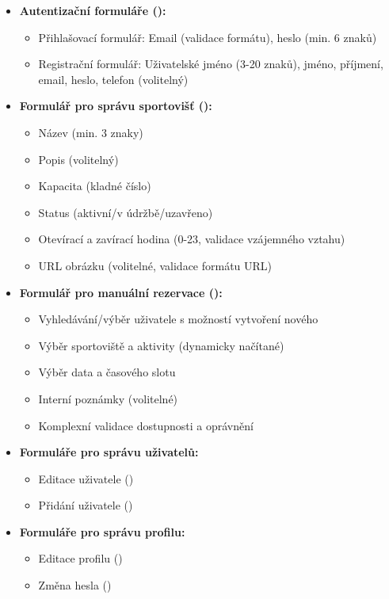 \documentclass[12pt, a4paper]{article}
\begin{document}
\begin{itemize}
    \item \textbf{Autentizační formuláře ():}
        \begin{itemize}
            \item Přihlašovací formulář: Email (validace formátu), heslo (min. 6 znaků)
            \item Registrační formulář: Uživatelské jméno (3-20 znaků), jméno, příjmení, email, heslo, telefon (volitelný)
        \end{itemize}
    \item \textbf{Formulář pro správu sportovišť ():}
        \begin{itemize}
            \item Název (min. 3 znaky)
            \item Popis (volitelný)
            \item Kapacita (kladné číslo)
            \item Status (aktivní/v údržbě/uzavřeno)
            \item Otevírací a zavírací hodina (0-23, validace vzájemného vztahu)
            \item URL obrázku (volitelné, validace formátu URL)
        \end{itemize}
    \item \textbf{Formulář pro manuální rezervace ():}
        \begin{itemize}
            \item Vyhledávání/výběr uživatele s možností vytvoření nového
            \item Výběr sportoviště a aktivity (dynamicky načítané)
            \item Výběr data a časového slotu
            \item Interní poznámky (volitelné)
            \item Komplexní validace dostupnosti a oprávnění
        \end{itemize}
    \item \textbf{Formuláře pro správu uživatelů:}
        \begin{itemize}
            \item Editace uživatele ()
            \item Přidání uživatele ()
        \end{itemize}
    \item \textbf{Formuláře pro správu profilu:}
        \begin{itemize}
            \item Editace profilu ()
            \item Změna hesla ()
        \end{itemize}
\end{itemize}
\end{document}
